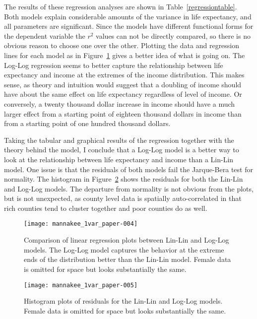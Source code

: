 \documentclass[12pt]{article}
\begin{document}
The results of these regression analyses are shown in Table~\ref{regressiontable}. Both models explain considerable amounts of the variance in life expectancy, and all parameters are significant. Since the models have different functional forms for the dependent variable the $r^2$ values can not be directly compared, so there is no obvious reason to choose one over the other. Plotting the data and regression lines for each model as in Figure~\ref{regressionplots} gives a better idea of what is going on. The Log-Log regression seems to better capture the relationship between life expectancy and income at the extremes of the income distribution. This makes sense, as theory and intuition would suggest that a doubling of income should have about the same effect on life expectancy regardless of level of income. Or conversely, a twenty thousand dollar increase in income should have a much larger effect from a starting point of eighteen thousand dollars in income than from a starting point of one hundred thousand dollars. 

Taking the tabular and graphical results of the regression together with the theory behind the model, I conclude that a Log-Log model is a better way to look at the relationship between life expectancy and income than a Lin-Lin model. One issue is that the residuals of both models fail the Jarque-Bera test for normality. The histogram in Figure~\ref{residualhist} shows the residuals for both the Lin-Lin and Log-Log models. The departure from normality is not obvious from the plots, but is not unexpected, as county level data is spatially auto-correlated in that rich counties tend to cluster together and poor counties do as well.

\begin{figure}[h]
\begin{center}
\texttt{[image: mannakee\_1var\_paper-004]}
\caption{Comparison of linear regression plots between Lin-Lin and Log-Log models. The Log-Log model captures the behavior at the extreme ends of the distribution better than the Lin-Lin model. Female data is omitted for space but looks substantially the same.}
\label{regressionplots}
\end{center}
\end{figure}
\begin{figure}
\begin{center}
\texttt{[image: mannakee\_1var\_paper-005]}
\caption{Histogram plots of residuals for the Lin-Lin and Log-Log models. Female data is omitted for space but looks substantially the same.}
\label{residualhist}
\end{center}
\end{figure}
\clearpage
\end{document}
